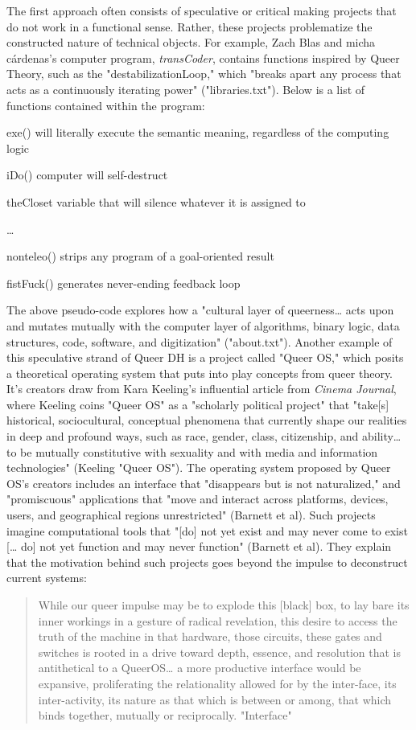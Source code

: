 \documentclass[11pt]{article}
\begin{document}
The first approach often consists of speculative or critical making
projects that do not work in a functional sense. Rather, these
projects problematize the constructed nature of technical objects. For
example, Zach Blas and micha cárdenas’s computer program,
\emph{transCoder}, contains functions inspired by Queer Theory, such as the
"destabilizationLoop," which "breaks apart any process that acts as a
continuously iterating power" ("libraries.txt"). Below is a list of
functions contained within the program:
\begin{SOURCE}
exe()
will literally execute the semantic meaning, regardless of the computing logic

iDo()
computer will self-destruct

theCloset
variable that will silence whatever it is assigned to

\ldots{}

nonteleo()
strips any program of a goal-oriented result

fistFuck()
generates never-ending feedback loop
\end{SOURCE}
The above pseudo-code explores how a "cultural layer of
queerness\ldots{} acts upon and mutates mutually with the computer layer of
algorithms, binary logic, data structures, code, software, and
digitization" ("about.txt"). Another example of this speculative
strand of Queer DH is a project called "Queer OS," which posits a
theoretical operating system that puts into play concepts from queer
theory. It's creators draw from Kara Keeling's influential article
from \emph{Cinema Journal}, where Keeling coins "Queer OS" as a "scholarly
political project" that "take[s] historical, sociocultural, conceptual
phenomena that currently shape our realities in deep and profound
ways, such as race, gender, class, citizenship, and ability\ldots{} to be
mutually constitutive with sexuality and with media and information
technologies" (Keeling "Queer OS"). The operating system proposed by
Queer OS's creators includes an interface that "disappears but is not
naturalized," and "promiscuous" applications that "move and interact
across platforms, devices, users, and geographical regions
unrestricted" (Barnett et al). Such projects imagine computational
tools that "[do] not yet exist and may never come to exist [… do] not
yet function and may never function" (Barnett et al). They explain
that the motivation behind such projects goes beyond the impulse to
deconstruct current systems:
\begin{quote}
While our queer impulse may be to explode this [black] box, to lay
bare its inner workings in a gesture of radical revelation, this
desire to access the truth of the machine in that hardware, those
circuits, these gates and switches is rooted in a drive toward depth,
essence, and resolution that is antithetical to a QueerOS\ldots{} a more
productive interface would be expansive, proliferating the
relationality allowed for by the inter-face, its inter-activity, its
nature as that which is between or among, that which binds together,
mutually or reciprocally. "Interface"
\end{quote}
\end{document}
